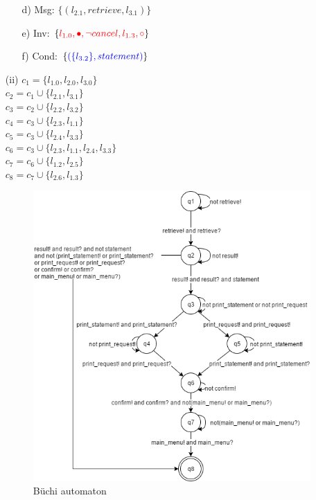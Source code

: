 \documentclass{scrartcl}
\begin{document}
\begin{itemize}
\begin{itemize}
        \item[d)] Msg: $ \{ (l_{2.1}, retrieve, l_{3.1}) \} $
        \item[e)] Inv: $ \{ {\color{red} l_{1.0}, \bullet, \neg cancel, l_{1.3}, \circ } \} $
        \item[f)] Cond: $ \{ {\color{blue} (\{ l_{3.2} \}, statement) } \} $
    \end{itemize}
    \pagebreak
    \item[(ii)] $ c_1 = \{ l_{1.0}, l_{2.0}, l_{3.0} \} $ \\
        $ c_2 = c_1 \cup \{ l_{2.1}, l_{3.1} \} $ \\
        $ c_3 = c_2 \cup \{ l_{2.2}, l_{3.2} \} $ \\
        $ c_4 = c_3 \cup \{ l_{2.3}, l_{1.1} \} $ \\
        $ c_5  = c_3 \cup \{ l_{2.4}, l_{3.3} \} $ \\
        $ c_6 = c_3 \cup \{ l_{2.3}, l_{1.1}, l_{2.4}, l_{3.3} \} $ \\
        $ c_7 = c_6 \cup \{ l_{1.2}, l_{2.5} \} $ \\
        $ c_8 = c_7 \cup \{ l_{2.6}, l_{1.3} \} $ \\

        \begin{figure}[h]
            \caption{Büchi automaton}
            \centering
            \includegraphics[width=\textwidth]{automaton.png}
        \end{figure}


\end{itemize}
\end{document}
